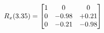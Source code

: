 \documentclass[preview]{standalone}
\begin{document}
\begin{align*}
\special{dvisvgm:raw <g id='unique000'>}R_{x}(3.35) = \begin{bmatrix}1 & 0 & 0 \\0 & -0.98 & +0.21 \\0 & -0.21 & -0.98\end{bmatrix}\special{dvisvgm:raw </g>}
\end{align*}
\end{document}
